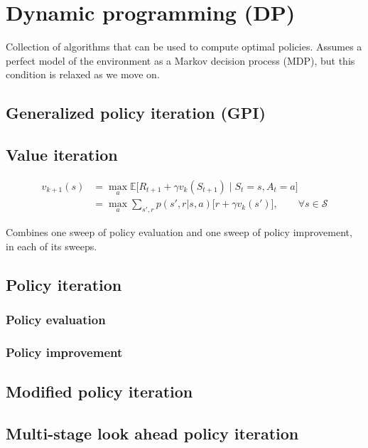\section{Dynamic programming (DP)}

Collection of algorithms that can be used to compute optimal policies.
Assumes a perfect model of the environment as a Markov decision process (MDP), but this condition is relaxed as we move on.

\subsection{Generalized policy iteration (GPI)}

\subsection{Value iteration}

\begin{equation}
    \begin{aligned}
        v_{k+1}(s)
         & =
        \max_{a} \mathbb{E} \big[ R_{t+1} + \gamma v_k(S_{t+1}) \;\big|\; S_t = s, A_t = a \big]
        \\ & =
        \max_{a} \sum_{s', r} p(s', r | s, a) \Big[ r + \gamma v_k(s') \Big]
        , \qquad \forall s \in \mathcal{S}
    \end{aligned}
\end{equation}

Combines one sweep of policy evaluation and one sweep of policy improvement, in each of its sweeps.

\subsection{Policy iteration}

\subsubsection{Policy evaluation}

\subsubsection{Policy improvement}

\subsection{Modified policy iteration}

\subsection{Multi-stage look ahead policy iteration}
